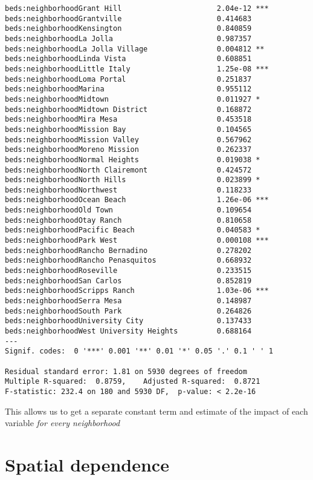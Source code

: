\documentclass[
  letterpaper,
  krantz2]{style/krantz}
\begin{document}
\begin{verbatim}
beds:neighborhoodGrant Hill                      2.04e-12 ***
beds:neighborhoodGrantville                      0.414683    
beds:neighborhoodKensington                      0.840859    
beds:neighborhoodLa Jolla                        0.987357    
beds:neighborhoodLa Jolla Village                0.004812 ** 
beds:neighborhoodLinda Vista                     0.608851    
beds:neighborhoodLittle Italy                    1.25e-08 ***
beds:neighborhoodLoma Portal                     0.251837    
beds:neighborhoodMarina                          0.955112    
beds:neighborhoodMidtown                         0.011927 *  
beds:neighborhoodMidtown District                0.168872    
beds:neighborhoodMira Mesa                       0.453518    
beds:neighborhoodMission Bay                     0.104565    
beds:neighborhoodMission Valley                  0.567962    
beds:neighborhoodMoreno Mission                  0.262337    
beds:neighborhoodNormal Heights                  0.019038 *  
beds:neighborhoodNorth Clairemont                0.424572    
beds:neighborhoodNorth Hills                     0.023899 *  
beds:neighborhoodNorthwest                       0.118233    
beds:neighborhoodOcean Beach                     1.26e-06 ***
beds:neighborhoodOld Town                        0.109654    
beds:neighborhoodOtay Ranch                      0.810658    
beds:neighborhoodPacific Beach                   0.040583 *  
beds:neighborhoodPark West                       0.000108 ***
beds:neighborhoodRancho Bernadino                0.278202    
beds:neighborhoodRancho Penasquitos              0.668932    
beds:neighborhoodRoseville                       0.233515    
beds:neighborhoodSan Carlos                      0.852819    
beds:neighborhoodScripps Ranch                   1.03e-06 ***
beds:neighborhoodSerra Mesa                      0.148987    
beds:neighborhoodSouth Park                      0.264826    
beds:neighborhoodUniversity City                 0.137433    
beds:neighborhoodWest University Heights         0.688164    
---
Signif. codes:  0 '***' 0.001 '**' 0.01 '*' 0.05 '.' 0.1 ' ' 1

Residual standard error: 1.81 on 5930 degrees of freedom
Multiple R-squared:  0.8759,    Adjusted R-squared:  0.8721 
F-statistic: 232.4 on 180 and 5930 DF,  p-value: < 2.2e-16
\end{verbatim}

This allows us to get a separate constant term and estimate of the
impact of each variable \emph{for every neighborhood}

\hypertarget{spatial-dependence-2}{%
\section{Spatial dependence}\label{spatial-dependence-2}}
\end{document}
